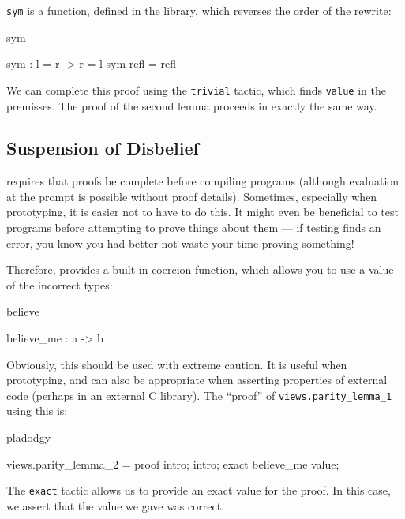 \noindent
\texttt{sym} is a function, defined in the library, which reverses the order of the rewrite:

\begin{SaveVerbatim}{sym}

sym : l = r -> r = l
sym refl = refl

\end{SaveVerbatim}

\noindent
We can complete this proof using the \texttt{trivial} tactic, which finds 
\texttt{value} in the premisses. The proof of the second lemma proceeds in
exactly the same way.

\subsection{Suspension of Disbelief}

\Idris{} requires that proofs be complete before compiling programs (although
evaluation at the prompt is possible without proof details). Sometimes,
especially when prototyping, it is easier not to have to do this. It might even
be beneficial to test programs before attempting to prove things about them ---
if testing finds an error, you know you had better not waste your time proving
something!

Therefore, \Idris{} provides a built-in coercion function, which allows you to use
a value of the incorrect types:

\begin{SaveVerbatim}{believe}

believe_me : a -> b 

\end{SaveVerbatim}

\noindent
Obviously, this should be used with extreme caution. It is useful when prototyping, and
can also be appropriate when asserting properties of external code (perhaps in an
external C library). The ``proof'' of \texttt{views.parity\_lemma\_1} using this is:

\begin{SaveVerbatim}{pladodgy}

views.parity_lemma_2 = proof {
    intro;
    intro;
    exact believe_me value;
}

\end{SaveVerbatim}

\noindent
The \texttt{exact} tactic allows us to provide an exact value for the proof. In this case,
we assert that the value we gave was correct.


